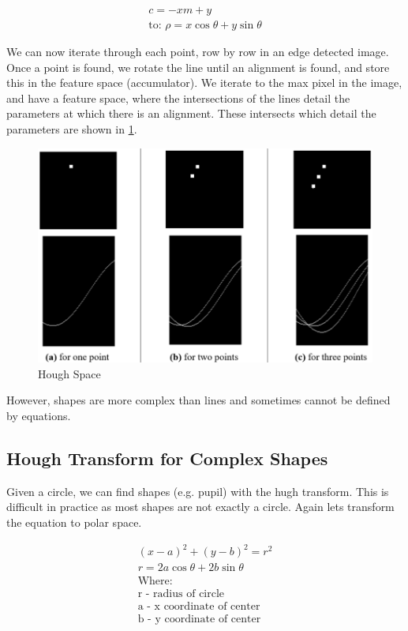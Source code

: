 \begin{align}
    c=-xm + y \\
    \text{to: } \rho = x\cos{\theta}+y\sin{\theta}
\end{align}

\noindent We can now iterate through each point, row by row in an edge detected image. Once a point is found, we rotate the line until an alignment is found, and store this in the feature space (accumulator). We iterate to the max pixel in the image, and have a feature space, where the intersections of the lines detail the parameters at which there is an alignment. These intersects which detail the parameters are shown in \ref{fig:hough}.

\begin{figure}[!h]
    \centering
    \includegraphics[scale=0.6]{Images/hough.png}
    \caption{Hough Space}
    \label{fig:hough}
\end{figure}

However, shapes are more complex than lines and sometimes cannot be defined by equations.

\subsection{Hough Transform for Complex Shapes}

Given a circle, we can find shapes (e.g. pupil) with the hugh transform. This is difficult in practice as most shapes are not exactly a circle. Again lets transform the equation to polar space.

\begin{align}
    (x-a)^{2} + (y-b)^{2} = r^{2} \\
    r = 2a\cos{\theta} + 2b\sin{\theta} \\
    \text{Where:} \\
    \text{r - radius of circle} \\
    \text{a - x coordinate of center} \\
    \text{b - y coordinate of center}
\end{align}

